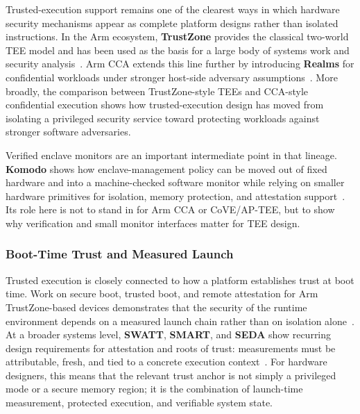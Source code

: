 Trusted-execution support remains one of the clearest ways in which hardware security mechanisms appear as complete platform designs rather than isolated instructions. In the Arm ecosystem, \textbf{TrustZone} provides the classical two-world TEE model and has been used as the basis for a large body of systems work and security analysis~\cite{arm_trustzone_whitepaper,pinto2019trustzone,guan2017trustshadow,cerdeira2020trustzone}. Arm CCA extends this line further by introducing \textbf{Realms} for confidential workloads under stronger host-side adversary assumptions~\cite{li2022cca,arm_cca_spec,arm_rme_spec}. More broadly, the comparison between TrustZone-style TEEs and CCA-style confidential execution shows how trusted-execution design has moved from isolating a privileged security service toward protecting workloads against stronger software adversaries.

Verified enclave monitors are an important intermediate point in that lineage.
\textbf{Komodo} shows how enclave-management policy can be moved out of fixed
hardware and into a machine-checked software monitor while relying on smaller
hardware primitives for isolation, memory protection, and attestation
support~\cite{ferraiuolo2017komodo}. Its role here is not to stand in for Arm
CCA or CoVE/AP-TEE, but to show why verification and small monitor interfaces
matter for TEE design.

\subsubsection{Boot-Time Trust and Measured Launch}

Trusted execution is closely connected to how a platform establishes trust at boot time. Work on secure boot, trusted boot, and remote attestation for Arm TrustZone-based devices demonstrates that the security of the runtime environment depends on a measured launch chain rather than on isolation alone~\cite{ling2021trustzoneatt,chen2024mraima,mao2025pdrima}. At a broader systems level, \textbf{SWATT}, \textbf{SMART}, and \textbf{SEDA} show recurring design requirements for attestation and roots of trust: measurements must be attributable, fresh, and tied to a concrete execution context~\cite{seshadri2004swatt,defrawy2012smart,asokan2015seda}. For hardware designers, this means that the relevant trust anchor is not simply a privileged mode or a secure memory region; it is the combination of launch-time measurement, protected execution, and verifiable system state.

